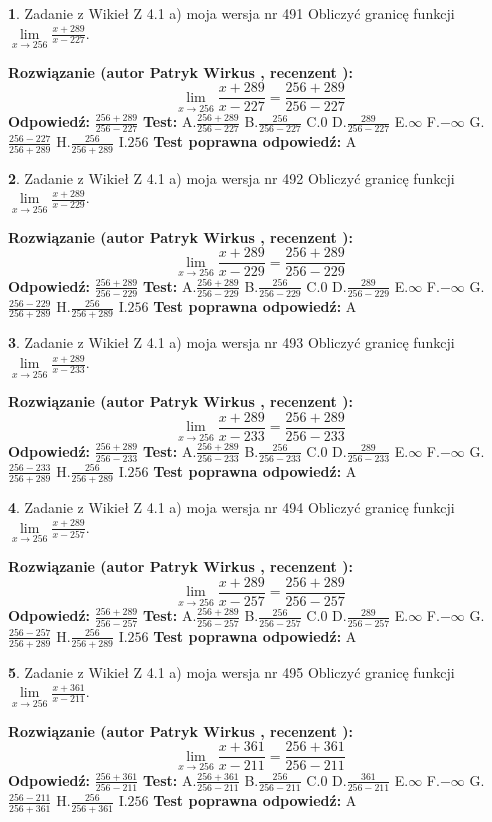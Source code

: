 \documentclass[12pt, a4paper]{article}
\theoremstyle{definition} %
\newtheorem{zad}{}
\newcommand{\zadStart}[1]{\begin{zad}#1\newline}
\newcommand{\zadStop}{\end{zad}}
\newcommand{\rozwStart}[2]{\noindent \textbf{Rozwiązanie (autor #1 , recenzent #2): }\newline}
\newcommand{\rozwStop}{\newline}
\newcommand{\odpStart}{\noindent \textbf{Odpowiedź:}\newline}
\newcommand{\odpStop}{\newline}
\newcommand{\testStart}{\noindent \textbf{Test:}\newline}
\newcommand{\testStop}{\newline}
\newcommand{\kluczStart}{\noindent \textbf{Test poprawna odpowiedź:}\newline}
\newcommand{\kluczStop}{\newline}
\begin{document}
\zadStart{Zadanie z Wikieł Z 4.1 a) moja wersja nr 491}
Obliczyć granicę funkcji $\lim\limits_{x\to256}\frac{x+289}{x-227}$.
\zadStop
\rozwStart{Patryk Wirkus}{}
$$\lim\limits_{x\to256}\frac{x+289}{x-227} = \frac{256+289}{256-227}$$
\rozwStop
\odpStart
$\frac{256+289}{256-227}$
\odpStop
\testStart
A.$\frac{256+289}{256-227}$
B.$\frac{256}{256-227}$
C.$0$
D.$\frac{289}{256-227}$
E.$\infty$
F.$-\infty$
G.$\frac{256-227}{256+289}$
H.$\frac{256}{256+289}$
I.$256$
\testStop
\kluczStart
A
\kluczStop



\zadStart{Zadanie z Wikieł Z 4.1 a) moja wersja nr 492}
Obliczyć granicę funkcji $\lim\limits_{x\to256}\frac{x+289}{x-229}$.
\zadStop
\rozwStart{Patryk Wirkus}{}
$$\lim\limits_{x\to256}\frac{x+289}{x-229} = \frac{256+289}{256-229}$$
\rozwStop
\odpStart
$\frac{256+289}{256-229}$
\odpStop
\testStart
A.$\frac{256+289}{256-229}$
B.$\frac{256}{256-229}$
C.$0$
D.$\frac{289}{256-229}$
E.$\infty$
F.$-\infty$
G.$\frac{256-229}{256+289}$
H.$\frac{256}{256+289}$
I.$256$
\testStop
\kluczStart
A
\kluczStop



\zadStart{Zadanie z Wikieł Z 4.1 a) moja wersja nr 493}
Obliczyć granicę funkcji $\lim\limits_{x\to256}\frac{x+289}{x-233}$.
\zadStop
\rozwStart{Patryk Wirkus}{}
$$\lim\limits_{x\to256}\frac{x+289}{x-233} = \frac{256+289}{256-233}$$
\rozwStop
\odpStart
$\frac{256+289}{256-233}$
\odpStop
\testStart
A.$\frac{256+289}{256-233}$
B.$\frac{256}{256-233}$
C.$0$
D.$\frac{289}{256-233}$
E.$\infty$
F.$-\infty$
G.$\frac{256-233}{256+289}$
H.$\frac{256}{256+289}$
I.$256$
\testStop
\kluczStart
A
\kluczStop



\zadStart{Zadanie z Wikieł Z 4.1 a) moja wersja nr 494}
Obliczyć granicę funkcji $\lim\limits_{x\to256}\frac{x+289}{x-257}$.
\zadStop
\rozwStart{Patryk Wirkus}{}
$$\lim\limits_{x\to256}\frac{x+289}{x-257} = \frac{256+289}{256-257}$$
\rozwStop
\odpStart
$\frac{256+289}{256-257}$
\odpStop
\testStart
A.$\frac{256+289}{256-257}$
B.$\frac{256}{256-257}$
C.$0$
D.$\frac{289}{256-257}$
E.$\infty$
F.$-\infty$
G.$\frac{256-257}{256+289}$
H.$\frac{256}{256+289}$
I.$256$
\testStop
\kluczStart
A
\kluczStop



\zadStart{Zadanie z Wikieł Z 4.1 a) moja wersja nr 495}
Obliczyć granicę funkcji $\lim\limits_{x\to256}\frac{x+361}{x-211}$.
\zadStop
\rozwStart{Patryk Wirkus}{}
$$\lim\limits_{x\to256}\frac{x+361}{x-211} = \frac{256+361}{256-211}$$
\rozwStop
\odpStart
$\frac{256+361}{256-211}$
\odpStop
\testStart
A.$\frac{256+361}{256-211}$
B.$\frac{256}{256-211}$
C.$0$
D.$\frac{361}{256-211}$
E.$\infty$
F.$-\infty$
G.$\frac{256-211}{256+361}$
H.$\frac{256}{256+361}$
I.$256$
\testStop
\kluczStart
A
\kluczStop
\end{document}
